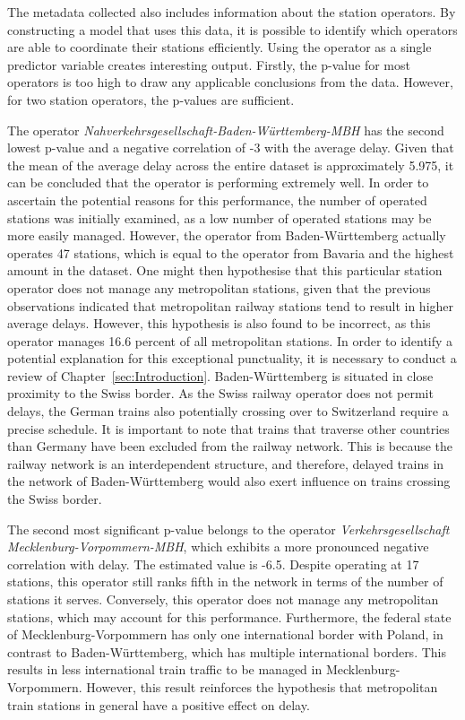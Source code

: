\documentclass[12pt,a4paper]{article}
\begin{document}
The metadata collected also includes information about the station operators. By constructing a model that uses this data, it is possible to identify which operators are able to coordinate their stations efficiently. Using the operator as a single predictor variable creates interesting output. 
Firstly, the p-value for most operators is too high to draw any applicable conclusions from the data. 
However, for two station operators, the p-values are sufficient. 

The operator \textit{Nahverkehrsgesellschaft-Baden-Württemberg-MBH} has the second lowest p-value and a negative correlation of -3 with the average delay. 
Given that the mean of the average delay across the entire dataset is approximately 5.975, it can be concluded that the operator is performing extremely well. 
In order to ascertain the potential reasons for this performance, the number of operated stations was initially examined, as a low number of operated stations may be more easily managed. 
However, the operator from Baden-Württemberg actually operates 47 stations, which is equal to the operator from Bavaria and the highest amount in the dataset. 
One might then hypothesise that this particular station operator does not manage any metropolitan stations, given that the previous observations indicated that metropolitan railway stations tend to result in higher average delays. 
However, this hypothesis is also found to be incorrect, as this operator manages 16.6 percent of all metropolitan stations. 
In order to identify a potential explanation for this exceptional punctuality, it is necessary to conduct a review of Chapter~\ref{sec:Introduction}. 
Baden-Württemberg is situated in close proximity to the Swiss border. As the Swiss railway operator does not permit delays, the German trains also potentially crossing over to Switzerland require a precise schedule. 
It is important to note that trains that traverse other countries than Germany have been excluded from the railway network. This is because the railway network is an interdependent structure, and therefore, delayed trains in the network of Baden-Württemberg would also exert influence on trains crossing the Swiss border.

The second most significant p-value belongs to the operator \textit{Verkehrsgesellschaft Mecklenburg-Vorpommern-MBH}, which exhibits a more pronounced negative correlation with delay. 
The estimated value is -6.5. Despite operating at 17 stations, this operator still ranks fifth in the network in terms of the number of stations it serves. 
Conversely, this operator does not manage any metropolitan stations, which may account for this performance. 
Furthermore, the federal state of Mecklenburg-Vorpommern has only one international border with Poland, in contrast to Baden-Württemberg, which has multiple international borders. 
This results in less international train traffic to be managed in Mecklenburg-Vorpommern. However, this result reinforces the hypothesis that metropolitan train stations in general have a positive effect on delay.
\end{document}
